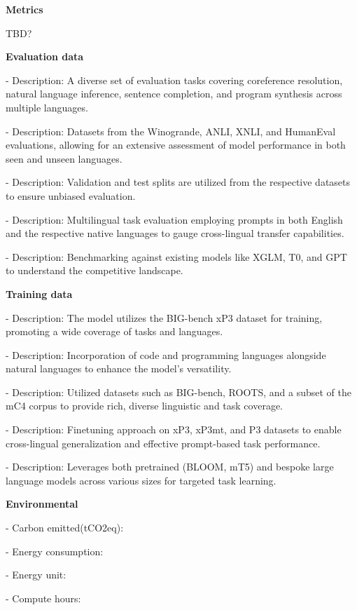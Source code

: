 \documentclass{article}
\begin{document}
\begin{adjustwidth}{-60pt}{-30pt}
\begin{singlespace}
\begin{tcolorbox}[title=\textbf{My Happy Model (test)! : Model Card},
breakable, sharp corners, boxrule=0.7pt]
    \textbf{Metrics}

    TBD?

    \textbf{Evaluation data}
            \item - Description: A diverse set of evaluation tasks covering coreference resolution, natural language inference, sentence completion, and program synthesis across multiple languages.
            \item - Description: Datasets from the Winogrande, ANLI, XNLI, and HumanEval evaluations, allowing for an extensive assessment of model performance in both seen and unseen languages.
            \item - Description: Validation and test splits are utilized from the respective datasets to ensure unbiased evaluation.
            \item - Description: Multilingual task evaluation employing prompts in both English and the respective native languages to gauge cross-lingual transfer capabilities.
            \item - Description: Benchmarking against existing models like XGLM, T0, and GPT to understand the competitive landscape.
    
    \textbf{Training data}
            \item - Description: The model utilizes the BIG-bench xP3 dataset for training, promoting a wide coverage of tasks and languages.
            \item - Description: Incorporation of code and programming languages alongside natural languages to enhance the model's versatility.
            \item - Description: Utilized datasets such as BIG-bench, ROOTS, and a subset of the mC4 corpus to provide rich, diverse linguistic and task coverage.
            \item - Description: Finetuning approach on xP3, xP3mt, and P3 datasets to enable cross-lingual generalization and effective prompt-based task performance.
            \item - Description: Leverages both pretrained (BLOOM, mT5) and bespoke large language models across various sizes for targeted task learning.
    
    \textbf{Environmental}
        \item - Carbon emitted(tCO2eq): 
    \item - Energy consumption: 
    \item - Energy unit: 
    \item - Compute hours: 


\end{tcolorbox}
\end{singlespace}
\end{adjustwidth}
\end{document}
